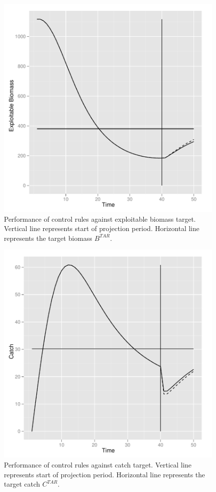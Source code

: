 \documentclass[a4paper]{article}
\begin{document}
\begin{figure}
\centering
\includegraphics{script-017}
\caption{Performance of control rules against exploitable biomass target. Vertical line represents start of projection period. 
Horizontal line represents the target biomass $B^{TAR}$.}
\label{fig:hcr_det_biomass}
\end{figure}

\begin{figure}
\centering
\includegraphics{script-018}
\caption{Performance of control rules against catch target. Vertical line represents start of projection period. 
Horizontal line represents the target catch $C^{TAR}$.}
\label{fig:hcr_det_catch}
\end{figure}
\end{document}
